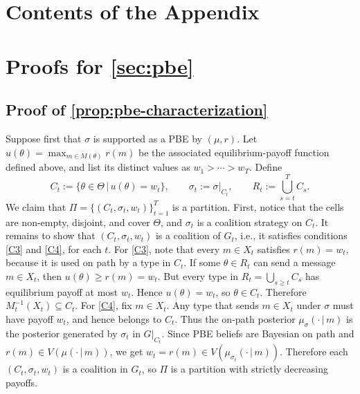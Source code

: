 \documentclass[11pt]{article}
\newcommand{\sep}{\,|\,}
\begin{document}
\clearpage
\printbibliography

\clearpage
\appendix
{}

\section*{Contents of the Appendix}
\startcontents[appendix]
\medskip

\section{Proofs for \cref{sec:pbe}}

\subsection*{Proof of \cref{prop:pbe-characterization}}
Suppose first that $\sigma$ is supported as a PBE by $(\mu,r)$. Let $u(\theta) = \max_{m \in M(\theta)} r(m)$ be the associated equilibrium-payoff function defined above, and list its distinct values as $w_1>\cdots>w_T$. Define
    \[
        C_t:=\{\theta\in\Theta \sep u(\theta) = w_t\},
        \qquad
        \sigma_t:=\sigma|_{C_t},
        \qquad
        R_t:=\bigcup_{s=t}^T C_s.
    \]
    We claim that $\Pi=\{(C_t,\sigma_t,w_t)\}_{t=1}^T$ is a partition.
    First, notice that the cells are non-empty, disjoint, and cover $\Theta$, and $\sigma_t$ is a coalition strategy on $C_t$. It remains to show that $(C_t,\sigma_t,w_t)$ is a coalition of $G_t$, i.e., it satisfies conditions \cref{C3} and \cref{C4}, for each $t$.
    For \cref{C3}, note that every $m\in X_t$ satisfies $r(m)=w_t$, because it is used on path by a type in $C_t$.
    If some $\theta\in R_t$ can send a message $m\in X_t$, then $u(\theta)\geq r(m)=w_t$.
    But every type in $R_t=\bigcup_{s\geq t}C_s$ has equilibrium payoff at most $w_t$.
    Hence $u(\theta)=w_t$, so $\theta\in C_t$.
    Therefore $M^{-1}_t(X_t)\subseteq C_t$.
    For \cref{C4}, fix $m \in X_t$. Any type that sends $m\in X_t$ under $\sigma$ must have payoff $w_t$, and hence belongs to $C_t$. Thus the on-path posterior $\mu_\sigma(\cdot\sep m)$ is the posterior generated by $\sigma_t$ in $G\vert_{C_t}$. Since PBE beliefs are Bayesian on path and $r(m)\in V(\mu(\cdot\sep m))$, we get $w_t=r(m)\in V(\mu_{\sigma_t}(\cdot\sep m))$. Therefore each $(C_t,\sigma_t,w_t)$ is a coalition in $G_t$, so $\Pi$ is a partition with strictly decreasing payoffs.
\end{document}
